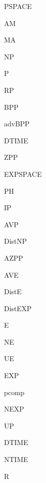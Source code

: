 
\usepackage{amsmath}
\usepackage{amsthm}
\usepackage{amssymb}
\usepackage{epsfig}
\newtheorem{theorem}{Theorem}
\newtheorem{lemma}{Lemma}
\newtheorem{claim}{Claim}
\newtheorem{proposition}{Proposition}
\newtheorem{corollary}{Corollary}
\theoremstyle{definition} \newtheorem{definition}{Definition}
\newtheorem{fact}{Fact}
\newenvironment{Proof}{{\it Proof. }}{$\Box$\\}
\newcommand{\numberP}{{\mathchoice{\raisebox{1pt}
        {$\displaystyle\#$}{\rm P}}{\raisebox{1pt}
        {$\textstyle\#$}{\rm P}}{\raisebox{1pt}
        {$\scriptstyle\#$}{\rm P}}{\raisebox{1pt}
        {$\scriptscriptstyle\#$}{\rm P}}}}
\newcommand{\sharpP}{\numberP}
\newcommand{\Hprime}{${\mathrm H}^{'}$}
\newcommand{\mo}{\leq^p_m}
\newcommand{\tr}{\leq^p_T}
\newcommand{\ttr}{\leq^p_{tt}}
\newcommand{\btt}{\leq^p_{btt}}
\newcommand{\onett}{\leq^p_{1tt}}
\newcommand{\twott}{\leq^p_{2tt}}
\newcommand{\pos}{\leq^p_{pos}}
\newcommand{\postt}{\leq^p_{postt}}
\newcommand{\ppcomp}{\P_{\pcomp}}
\newcommand{\DistS}{{\rm Dist\Sigma_2}}
\newcommand{\DistPNP}{{\rm Dist\P^{\NP}}}
\newcommand{\AVTIME}{{\rm AVTIME}}
\newcommand{\ppoly}{{\P/{\rm poly}}}

\newcommand{\ignore}[1]{}

\newcommand{\mathmake}[1]{{\mathchoice%
   {\raisebox{0pt}{$\displaystyle #1$}}
   {\raisebox{0pt}{$\textstyle #1$}}
   {\raisebox{0pt}{$\scriptstyle #1$}}
   {\raisebox{0pt}{$\scriptscriptstyle #1$}}}}

\newcommand{\mathraise}[2]{{\mathchoice%
   {\raisebox{1pt}{$\displaystyle #1$}{#2}}
   {\raisebox{1pt}{$\textstyle #1$}{#2}}
   {\raisebox{1pt}{$\scriptstyle #1$}{#2}}
   {\raisebox{1pt}{$\scriptscriptstyle #1$}{#2}}}}

\newcommand{\newfontobj}[2]{
  \newcommand{#1}[1]{
    \expandafter\def\csname##1\endcsname{{#2 ##1}}}}

\newfontobj{\class}{\rm}
\newfontobj{\lang}{\bf}
\newfontobj{\oper}{\rm}


\class{PSPACE}          %
\class{AM}              %
\class{MA}
\class{NP}
\class{P}
\class{RP}
\class{BPP}
\class{advBPP}
\class{DTIME}
\class{ZPP}
\class{EXPSPACE}
\class{PH}
\class{IP}
\class{AVP}
\newcommand{\AP}{{\rm Average\mbox{-}P}}
\class{DistNP}
\class{AZPP}
\class{AVE}
\class{DistE}
\class{DistEXP}
\class{E}
\class{NE}
\class{UE}
\class{EXP}
\class{pcomp}
\class{NEXP}
\class{UP}
\class{DTIME}
\class{NTIME}
\class{R}
\newcommand{\CoNP}{{\mbox {\rm co-NP}}}
\newcommand{\CoUP}{{\mbox {\rm co-UP}}}
\newcommand{\CoNE}{{\mbox{\rm co-NE}}}
\newcommand{\SAT}{{\mbox SAT}}


